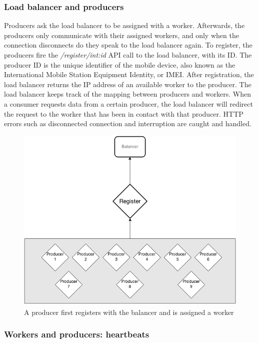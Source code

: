 \documentclass{sigchi}
\begin{document}
\subsubsection{Load balancer and producers}

Producers ask the load balancer to be assigned with a worker. Afterwards, the producers only communicate with their assigned workers, and only when the connection disconnects do they speak to the load balancer again. To register, the producers fire the {\it /register/int:id} API call to the load balancer, with its ID. The producer ID is the unique identifier of the mobile device, also known as the International Mobile Station Equipment Identity, or IMEI. After registration, the load balancer returns the IP address of an available worker to the producer. The load balancer keeps track of the mapping between producers and workers. When a consumer requests data from a certain producer, the load balancer will redirect the request to the worker that has been in contact with that producer. HTTP errors such as disconnected connection and interruption are caught and handled.

\begin{figure}[!h]
\centering
\includegraphics[width=0.9\columnwidth]{img/producer}
\caption{A producer first registers with the balancer and is assigned a worker}
\label{fig:producer}
\end{figure}

\subsubsection{Workers and producers: heartbeats}
\end{document}
